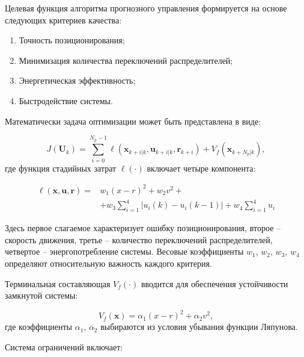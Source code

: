 Целевая функция алгоритма прогнозного управления формируется на основе следующих критериев качества:

\begin{enumerate}
\item Точность позиционирования;
\item Минимизация количества переключений распределителей;
\item Энергетическая эффективность;
\item Быстродействие системы.
\end{enumerate}

Математически задача оптимизации может быть представлена в виде:

\begin{equation}
J(\mathbf{U}_k) = \sum_{i=0}^{N_p-1} \ell(\mathbf{x}_{k+i|k}, \mathbf{u}_{k+i|k}, \mathbf{r}_{k+i}) + V_f(\mathbf{x}_{k+N_p|k}),
\end{equation}
где функция стадийных затрат $\ell(\cdot)$ включает четыре компонента:

\begin{equation}
\begin{aligned}
\ell(\mathbf{x}, \mathbf{u}, \mathbf{r}) = & w_1(x - r)^2 + w_2v^2 + \\
&  + w_3\sum_{i=1}^4|u_i(k) - u_i(k-1)| + w_4\sum_{i=1}^4 u_i
\end{aligned}
\end{equation}

Здесь первое слагаемое характеризует ошибку позиционирования, второе -- скорость движения, третье -- количество переключений распределителей,
четвертое -- энергопотребление системы. Весовые коэффициенты $w_1$, $w_2$, $w_3$, $w_4$ определяют относительную важность каждого критерия.

Терминальная составляющая $V_f(\cdot)$ вводится для обеспечения устойчивости замкнутой системы:

\begin{equation}
V_f(\mathbf{x}) = \alpha_1(x - r)^2 + \alpha_2v^2,
\end{equation}
где коэффициенты $\alpha_1$, $\alpha_2$ выбираются из условия убывания функции Ляпунова.

Система ограничений включает:

